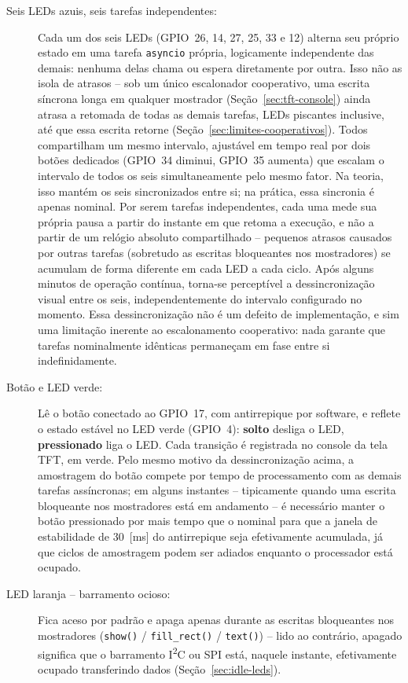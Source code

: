 \documentclass[12pt,a4paper]{article}
\begin{document}
\begin{description}
  \item[Seis LEDs azuis, seis tarefas independentes:] Cada um dos seis LEDs (GPIO~26, 14, 27, 25, 33 e 12) alterna seu próprio estado em uma tarefa \texttt{asyncio} própria, logicamente independente das demais: nenhuma delas chama ou espera diretamente por outra. Isso não as isola de atrasos -- sob um único escalonador cooperativo, uma escrita síncrona longa em qualquer mostrador (Seção~\ref{sec:tft-console}) ainda atrasa a retomada de todas as demais tarefas, LEDs piscantes inclusive, até que essa escrita retorne (Seção~\ref{sec:limites-cooperativos}). Todos compartilham um mesmo intervalo, ajustável em tempo real por dois botões dedicados (GPIO~34 diminui, GPIO~35 aumenta) que escalam o intervalo de todos os seis simultaneamente pelo mesmo fator. Na teoria, isso mantém os seis sincronizados entre si; na prática, essa sincronia é apenas nominal. Por serem tarefas independentes, cada uma mede sua própria pausa a partir do instante em que retoma a execução, e não a partir de um relógio absoluto compartilhado -- pequenos atrasos causados por outras tarefas (sobretudo as escritas bloqueantes nos mostradores) se acumulam de forma diferente em cada LED a cada ciclo. Após alguns minutos de operação contínua, torna-se perceptível a dessincronização visual entre os seis, independentemente do intervalo configurado no momento. Essa dessincronização não é um defeito de implementação, e sim uma limitação inerente ao escalonamento cooperativo: nada garante que tarefas nominalmente idênticas permaneçam em fase entre si indefinidamente.

  \item[Botão e LED verde:] Lê o botão conectado ao GPIO~17, com antirrepique por software, e reflete o estado estável no LED verde (GPIO~4): \textbf{solto} desliga o LED, \textbf{pressionado} liga o LED. Cada transição é registrada no console da tela TFT, em verde. Pelo mesmo motivo da dessincronização acima, a amostragem do botão compete por tempo de processamento com as demais tarefas assíncronas; em alguns instantes -- tipicamente quando uma escrita bloqueante nos mostradores está em andamento -- é necessário manter o botão pressionado por mais tempo que o nominal para que a janela de estabilidade de 30~[ms] do antirrepique seja efetivamente acumulada, já que ciclos de amostragem podem ser adiados enquanto o processador está ocupado.

  \item[LED laranja -- barramento ocioso:] Fica aceso por padrão e apaga apenas durante as escritas bloqueantes nos mostradores (\texttt{show()} / \texttt{fill\_rect()} / \texttt{text()}) -- lido ao contrário, apagado significa que o barramento I\textsuperscript{2}C ou SPI está, naquele instante, efetivamente ocupado transferindo dados (Seção~\ref{sec:idle-leds}).


\end{description}
\end{document}
